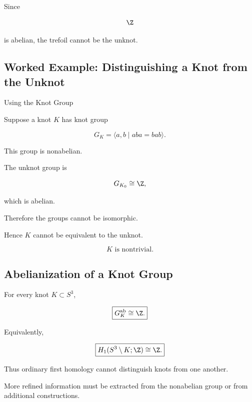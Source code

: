Since

\[
\Z
\]

is abelian, the trefoil cannot be the unknot.

\subsection{Worked Example: Distinguishing a Knot from the Unknot}
\label{subsec:worked-knot-group}

\begin{workedexamplebox}{Using the Knot Group}

Suppose a knot \(K\) has knot group

\[
G_K
=
\langle
a,b
\mid
aba=bab
\rangle.
\]

This group is nonabelian.

The unknot group is

\[
G_{K_0}\cong\Z,
\]

which is abelian.

Therefore the groups cannot be isomorphic.

Hence \(K\) cannot be equivalent to the unknot.

\begin{answerbox}
\[
\boxed{
K\text{ is nontrivial}.
}
\]
\end{answerbox}
\end{workedexamplebox}

\subsection{Abelianization of a Knot Group}
\label{subsec:abelianization-knot-group}

For every knot \(K\subset S^3\),

\[
\boxed{
G_K^{\mathrm{ab}}
\cong
\Z.
}
\]

Equivalently,

\[
\boxed{
H_1(S^3\setminus K;\Z)
\cong
\Z.
}
\]

Thus ordinary first homology cannot distinguish knots from one another.

More refined information must be extracted from the nonabelian group or from
additional constructions.

